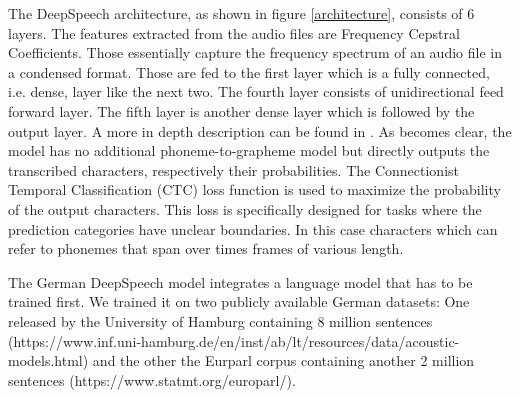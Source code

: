 The DeepSpeech architecture, as shown in figure \ref{architecture}, consists of 6 layers. The features extracted from the audio files are Frequency Cepstral Coefficients. Those essentially capture the frequency spectrum of an audio file in a condensed format. Those are fed to the first layer which is a fully connected, i.e. dense, layer like the next two. The fourth layer consists of unidirectional feed forward layer. The fifth layer is another dense layer which is followed by the output layer. A more in depth description can be found in \citet{Agarwal2019GermanES}. As becomes clear, the model has no additional phoneme-to-grapheme model but directly outputs the transcribed characters, respectively their probabilities. The Connectionist Temporal Classification (CTC) loss function is used to maximize the probability of the output characters. This loss is specifically designed for tasks where the prediction categories have unclear boundaries. In this case characters which can refer to phonemes that span over times frames of various length. 

The German DeepSpeech model integrates a language model that has to be trained first. We trained it on two publicly available German datasets: One released by the University of Hamburg containing 8 million sentences (https://www.inf.uni-hamburg.de/en/inst/ab/lt/resources/data/acoustic-models.html) and the other the Eurparl corpus containing another 2 million sentences (https://www.statmt.org/europarl/).  